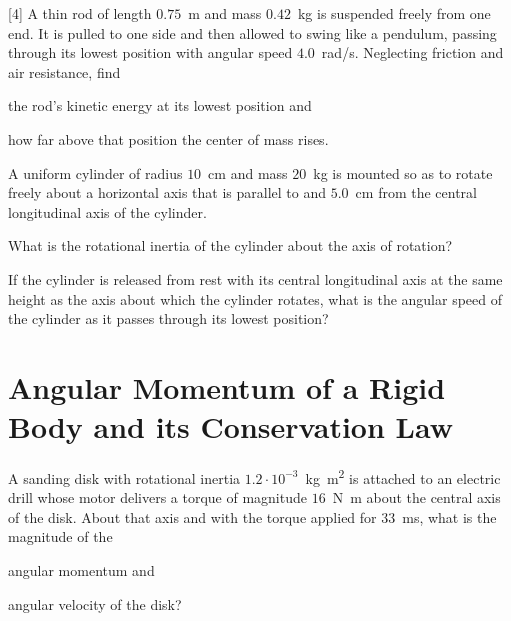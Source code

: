 \begin{problem}
	\correct{5.7cm}[4]%
	A thin rod of length $0.75$~m and mass $0.42$~kg is suspended freely from one end. It is pulled to one side and then allowed to swing like a pendulum, passing through its lowest position with angular speed $4.0$~rad/s. Neglecting friction and air resistance, find 
	\begin{enumerate*}[label=(\alph*)]
		\item the rod’s kinetic energy at its lowest position and
		\item how far above that position the center of mass rises.
	\end{enumerate*}
\end{problem}

\begin{problem}
	A uniform cylinder of radius $10$~cm and mass $20$~kg is mounted so as to rotate freely about a horizontal axis that is parallel to and $5.0$~cm from the central longitudinal axis of the cylinder. 
	\begin{enumerate*}[label=(\alph*)]
		\item  What is the rotational inertia of the cylinder about the axis of rotation?
		\item  If the cylinder is released from rest with its central longitudinal axis at the same height as the axis about which the cylinder rotates, what is the angular speed of the cylinder as it passes through its lowest position?
	\end{enumerate*}
\end{problem}

\section{Angular Momentum of a Rigid Body and its Conservation Law}

\begin{problem}
	A sanding disk with rotational inertia $1.2 \cdot 10^{-3}$~\si{\kilo\gram\square\meter} is attached to an electric drill whose motor delivers a torque of magnitude $16$~\si{\newton\meter} about the central axis of the disk. About that axis and with the torque applied for $33$~ms, what is the magnitude of the 
	\begin{enumerate*}[label=(\alph*)]
		\item angular momentum and
		\item angular velocity of the disk?
	\end{enumerate*}
\end{problem}


